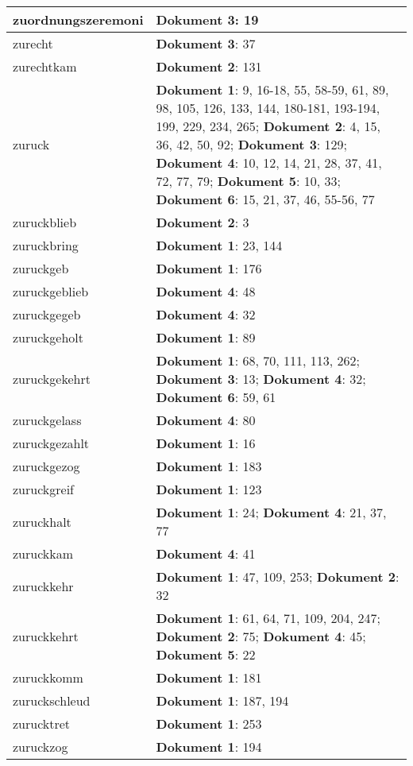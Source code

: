\documentclass[a5paper]{article}
\begin{document}
\begin{longtable}[l]{|l|p{3in}|}
\hline
zuordnungszeremoni & \textbf{Dokument 3}: 19 \\
\hline
zurecht & \textbf{Dokument 3}: 37 \\
\hline
zurechtkam & \textbf{Dokument 2}: 131 \\
\hline
zuruck & \textbf{Dokument 1}: 9, 16-18, 55, 58-59, 61, 89, 98, 105, 126, 133, 144, 180-181, 193-194, 199, 229, 234, 265; \textbf{Dokument 2}: 4, 15, 36, 42, 50, 92; \textbf{Dokument 3}: 129; \textbf{Dokument 4}: 10, 12, 14, 21, 28, 37, 41, 72, 77, 79; \textbf{Dokument 5}: 10, 33; \textbf{Dokument 6}: 15, 21, 37, 46, 55-56, 77 \\
\hline
zuruckblieb & \textbf{Dokument 2}: 3 \\
\hline
zuruckbring & \textbf{Dokument 1}: 23, 144 \\
\hline
zuruckgeb & \textbf{Dokument 1}: 176 \\
\hline
zuruckgeblieb & \textbf{Dokument 4}: 48 \\
\hline
zuruckgegeb & \textbf{Dokument 4}: 32 \\
\hline
zuruckgeholt & \textbf{Dokument 1}: 89 \\
\hline
zuruckgekehrt & \textbf{Dokument 1}: 68, 70, 111, 113, 262; \textbf{Dokument 3}: 13; \textbf{Dokument 4}: 32; \textbf{Dokument 6}: 59, 61 \\
\hline
zuruckgelass & \textbf{Dokument 4}: 80 \\
\hline
zuruckgezahlt & \textbf{Dokument 1}: 16 \\
\hline
zuruckgezog & \textbf{Dokument 1}: 183 \\
\hline
zuruckgreif & \textbf{Dokument 1}: 123 \\
\hline
zuruckhalt & \textbf{Dokument 1}: 24; \textbf{Dokument 4}: 21, 37, 77 \\
\hline
zuruckkam & \textbf{Dokument 4}: 41 \\
\hline
zuruckkehr & \textbf{Dokument 1}: 47, 109, 253; \textbf{Dokument 2}: 32 \\
\hline
zuruckkehrt & \textbf{Dokument 1}: 61, 64, 71, 109, 204, 247; \textbf{Dokument 2}: 75; \textbf{Dokument 4}: 45; \textbf{Dokument 5}: 22 \\
\hline
zuruckkomm & \textbf{Dokument 1}: 181 \\
\hline
zuruckschleud & \textbf{Dokument 1}: 187, 194 \\
\hline
zurucktret & \textbf{Dokument 1}: 253 \\
\hline
zuruckzog & \textbf{Dokument 1}: 194 \\
\hline

\end{longtable}
\end{document}

